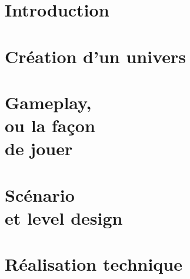 


\clearpage
\null
\newpage





{\hypersetup{linkcolor=black}
	\setcounter{tocdepth}{0}
	\tableofcontents
}
\newpage


\chapter{Introduction}



\chapter{Création d'un univers}



\chapter[Gameplay, ou la façon de jouer]{Gameplay,\\ou la façon\\de jouer}


\chapter[Scénario et level design]{Scénario\\et level design}


%

\chapter{Réalisation technique}



%


